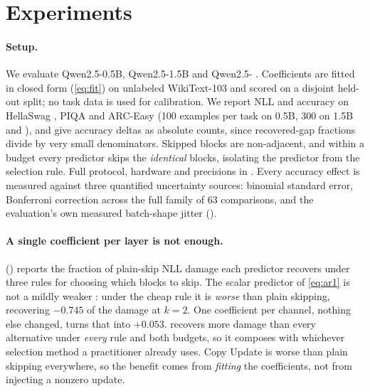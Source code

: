 \section{Experiments}
\label{sec:experiments}





\paragraph{Setup.} We evaluate Qwen2.5-0.5B, Qwen2.5-1.5B and Qwen2.5-\topscale
\citep{qwen2025}. Coefficients are fitted in closed form (\cref{eq:fit}) on unlabeled
WikiText-103 \citep{merity2017pointer} and scored on a disjoint held-out split; no task
data is used for calibration. We report NLL and accuracy on HellaSwag
\citep{zellers2019hellaswag}, PIQA \citep{bisk2020piqa} and ARC-Easy
\citep{clark2018think} (100 examples per task on 0.5B, 300 on 1.5B and
\topscale), and give accuracy deltas as absolute counts, since recovered-gap fractions
divide by very small denominators. Skipped blocks are non-adjacent, and within a budget
every predictor skips the \emph{identical} blocks, isolating the predictor from the
selection rule. Full protocol, hardware and precisions in . Every accuracy effect is measured against three
quantified uncertainty sources: binomial standard error, Bonferroni correction across the full
family of 63 comparisons, and the evaluation's own measured batch-shape jitter
().

\paragraph{A single coefficient per layer is not enough.}  () reports the
fraction of plain-skip NLL damage each predictor recovers under three rules for choosing
which blocks to skip. The scalar predictor of \cref{eq:ar1} is not a mildly weaker \mname:
under the cheap rule it is \emph{worse} than plain skipping, recovering $-0.745$ of
the damage at $k=2$. One coefficient per channel, nothing else changed, turns that into
$+0.053$. \mname recovers more damage than every alternative under \emph{every} rule
and both budgets, so it composes with whichever selection method a practitioner already
uses. Copy Update is worse than plain skipping everywhere, so the benefit comes from
\emph{fitting} the coefficients, not from injecting a nonzero update.

